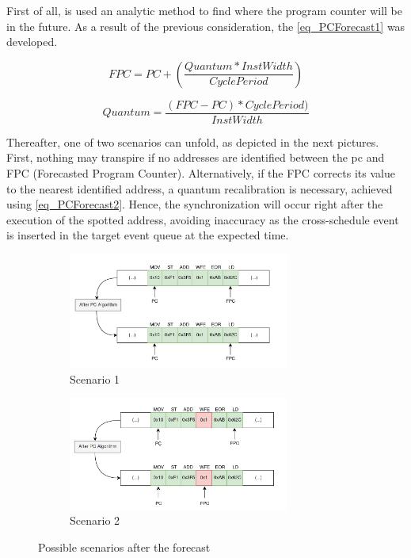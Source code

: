 First of all, is used an analytic method to find where the program counter will be in the future. As a result of the previous consideration, 
the \autoref{eq_PCForecast1} was developed.

\begin{equation}
    FPC = PC + \left( \frac{Quantum * InstWidth}{CyclePeriod} \right)
    \label{eq_PCForecast1}
\end{equation}

\begin{equation}
    Quantum = \frac{  \left( FPC - PC \right) * CyclePeriod)}{InstWidth} 
    \label{eq_PCForecast2}
\end{equation}

Thereafter, one of two scenarios can unfold, as depicted in the next pictures. First, nothing may transpire if no addresses are 
identified between the \gls{pc} and FPC (Forecasted Program Counter). Alternatively, if the FPC corrects its value to the nearest identified 
address, a quantum recalibration is necessary, achieved using \autoref{eq_PCForecast2}. Hence, the synchronization will occur right after the 
execution of the spotted address, avoiding inaccuracy as the cross-schedule event is inserted in the target event queue at the expected time.

\begin{figure} [H]
\centering
\begin{subfigure}{\textwidth}
    \includegraphics[width=0.8\textwidth]{Images/PCAlgrithm_noCut.png}
    \caption{ Scenario 1 }
    \label{fig:PCAlgrithm_noCut}
\end{subfigure}
\begin{subfigure}{\textwidth}
    \includegraphics[width=0.8\textwidth]{Images/PCAlgrithm_Cut.png}
    \caption{ Scenario 2 }
    \label{fig:PCAlgrithm_Cut}
\end{subfigure}
        
\caption{Possible scenarios after the forecast}
\label{fig:PCAlgorithm_differentScenarios}
\end{figure}

